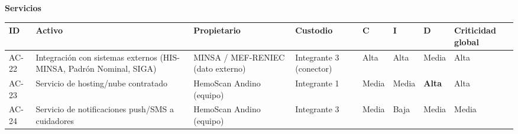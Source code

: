 \documentclass[11pt,a4paper]{article}
\begin{document}
\textbf{Servicios}

{\small
\begin{longtable}[]{@{}
  >{\raggedright\arraybackslash}p{}
  >{\raggedright\arraybackslash}p{}
  >{\raggedright\arraybackslash}p{}
  >{\raggedright\arraybackslash}p{}
  >{\raggedright\arraybackslash}p{}
  >{\raggedright\arraybackslash}p{}
  >{\raggedright\arraybackslash}p{}
  >{\raggedright\arraybackslash}p{}@{}}
\toprule\noalign{}
\begin{minipage}[b]{\linewidth}\raggedright
ID
\end{minipage} & \begin{minipage}[b]{\linewidth}\raggedright
Activo
\end{minipage} & \begin{minipage}[b]{\linewidth}\raggedright
Propietario
\end{minipage} & \begin{minipage}[b]{\linewidth}\raggedright
Custodio
\end{minipage} & \begin{minipage}[b]{\linewidth}\raggedright
C
\end{minipage} & \begin{minipage}[b]{\linewidth}\raggedright
I
\end{minipage} & \begin{minipage}[b]{\linewidth}\raggedright
D
\end{minipage} & \begin{minipage}[b]{\linewidth}\raggedright
Criticidad global
\end{minipage} \\
\midrule\noalign{}
\endhead
\bottomrule\noalign{}
\endlastfoot
AC-22 & Integración con sistemas externos (HIS-MINSA, Padrón Nominal, SIGA) & MINSA / MEF-RENIEC (dato externo) & Integrante 3 (conector) & Alta & Alta & Media & Alta \\
AC-23 & Servicio de hosting/nube contratado & HemoScan Andino (equipo) & Integrante 1 & Media & Media & \textbf{Alta} & Alta \\
AC-24 & Servicio de notificaciones push/SMS a cuidadores & HemoScan Andino (equipo) & Integrante 3 & Media & Baja & Media & Media \\
\end{longtable}
}
\end{document}
